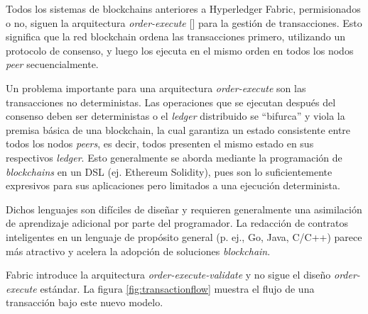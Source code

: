 
Todos los sistemas de blockchains anteriores a Hyperledger Fabric, permisionados o no, siguen la arquitectura  \textit{order-execute} [\cite{hlf-paper}] para la gestión de transacciones. Esto significa que la red blockchain ordena las transacciones primero, utilizando un protocolo de consenso, y luego los ejecuta en el mismo orden en todos los nodos \textit{peer} secuencialmente.


Un problema importante para una arquitectura \textit{order-execute} son las transacciones no deterministas. Las operaciones que se ejecutan después del consenso deben ser deterministas o el \textit{ledger} distribuido se “bifurca” y viola la premisa básica de una blockchain, la cual garantiza un estado consistente entre todos los nodos \textit{peers}, es decir, todos presenten el mismo estado en sus respectivos \textit{ledger}. Esto generalmente se aborda mediante la programación de \textit{blockchains} en un DSL (ej. Ethereum Solidity), pues son lo suficientemente expresivos para sus aplicaciones pero limitados a una ejecución determinista.

Dichos lenguajes son difíciles de diseñar y requieren generalmente una asimilación de aprendizaje adicional por parte del programador. La redacción de contratos inteligentes en un lenguaje de propósito general (p. ej., Go, Java, C/C++) parece más atractivo y acelera la adopción de soluciones \textit{blockchain}.


Fabric introduce la arquitectura \textit{order-execute-validate} y no sigue el diseño \textit{order-execute} estándar. La figura \ref{fig:transactionflow} muestra el flujo de una transacción bajo este nuevo modelo.\\[5cm]

